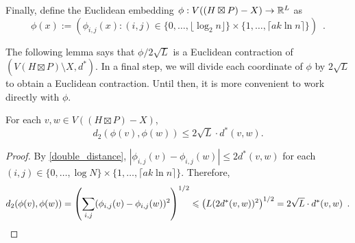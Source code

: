 \documentclass{patmorin}
\renewcommand{\le}{\leqslant}
\newcommand{\pat}[1]{\textcolor{Blue}{Pat: #1}}
\begin{document}
Finally, define the Euclidean embedding $\phi:V((H\boxtimes P)-X)\to\mathbb{R}^L$ as
\[
   \phi(x) := \left(\phi_{i,j}(x):(i,j)\in \{0,\ldots,\lfloor \log_2 n\rfloor\}\times\{1,\ldots,\lceil a k\ln n\rceil\}\right) \enspace .
\]


The following lemma says that $\phi/2\sqrt{L}$ is a Euclidean contraction of $(V(H\boxtimes P)\setminus X,d^*)$.  In a final step, we will divide each coordinate of $\phi$ by $2\sqrt{L}$ to obtain a Euclidean contraction. Until then, it is more convenient to work directly with $\phi$.

\begin{lem}\label{euclidean_contraction}
  For each $v,w\in V((H\boxtimes P)-X)$, $$d_2(\phi(v),\phi(w)) \le 2\sqrt{L}\cdot d^*(v,w).$$
\end{lem}

\begin{proof}
  By \cref{double_distance}, $|\phi_{i,j}(v)-\phi_{i,j}(w)|\le 2d^*(v,w)$ for each $(i,j)\in\{0,\ldots,\log N\}\times\{1,\ldots,\lceil ak\ln n\rceil\}$.  Therefore,
  \[
    d_2(\phi(v),\phi(w)) = \left(\sum_{i,j}(\phi_{i,j}(v)-\phi_{i,j}(w))^2\right)^{1/2}
    \le \left(L (2d^*(v,w))^2\right)^{1/2} = 2\sqrt{L}\cdot d^*(v,w) \enspace . \qedhere
  \]
\end{proof}



\end{document}
